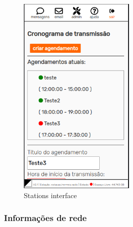 \documentclass[11pt,a4paper]{article}
\begin{document}
\begin{figure}[H]
    \centering
    \includegraphics[width=0.5\textwidth]{screenshots/frontend/pt_kn/central.png}
    \caption{Stations interface}
	\vspace{-10pt}
    \label{fig:central}
\end{figure} 
    
\subsubsection{Informações de rede} 
\label{gui_net_info}
\end{document}
